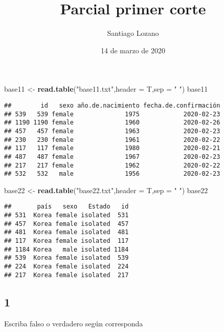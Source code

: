 \documentclass[]{article}
\title{Parcial primer corte}
\author{Santiago Lozano}
\date{14 de marzo de 2020}
\newenvironment{Shaded}{\begin{snugshade}}{\end{snugshade}}
\newcommand{\KeywordTok}[1]{\textcolor[rgb]{0.13,0.29,0.53}{\textbf{#1}}}
\newcommand{\DataTypeTok}[1]{\textcolor[rgb]{0.13,0.29,0.53}{#1}}
\newcommand{\StringTok}[1]{\textcolor[rgb]{0.31,0.60,0.02}{#1}}
\newcommand{\NormalTok}[1]{#1}
\begin{document}
\maketitle

\begin{Shaded}
\begin{Highlighting}[]
\NormalTok{base11 <-}\StringTok{ }\KeywordTok{read.table}\NormalTok{(}\StringTok{"base11.txt"}\NormalTok{,}\DataTypeTok{header =}\NormalTok{ T,}\DataTypeTok{sep =} \StringTok{" "}\NormalTok{)}
\NormalTok{base11}
\end{Highlighting}
\end{Shaded}

\begin{verbatim}
##        id   sexo año.de.nacimiento fecha.de.confirmación
## 539   539 female              1975            2020-02-23
## 1190 1190 female              1960            2020-02-26
## 457   457 female              1963            2020-02-23
## 230   230 female              1961            2020-02-22
## 117   117 female              1980            2020-02-21
## 487   487 female              1967            2020-02-23
## 217   217 female              1962            2020-02-22
## 532   532   male              1956            2020-02-23
\end{verbatim}

\begin{Shaded}
\begin{Highlighting}[]
\NormalTok{base22 <-}\StringTok{ }\KeywordTok{read.table}\NormalTok{(}\StringTok{"base22.txt"}\NormalTok{,}\DataTypeTok{header =}\NormalTok{ T,}\DataTypeTok{sep =} \StringTok{" "}\NormalTok{)}
\NormalTok{base22}
\end{Highlighting}
\end{Shaded}

\begin{verbatim}
##       país   sexo   Estado   id
## 531  Korea female isolated  531
## 457  Korea female isolated  457
## 481  Korea female isolated  481
## 117  Korea female isolated  117
## 1184 Korea   male isolated 1184
## 539  Korea female isolated  539
## 224  Korea female isolated  224
## 217  Korea female isolated  217
\end{verbatim}

\subsection{1}\label{section}

Escriba falso o verdadero según corresponda
\end{document}
